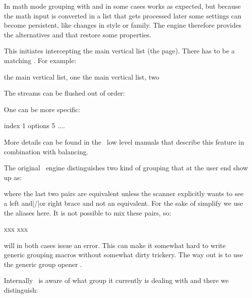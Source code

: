 In math mode grouping with  and  in some cases
works as expected, but because the math input is converted in a list that gets
processed later some settings can become persistent, like changes in style or
family. The engine therefore provides the alternatives  and
 that restore some properties.

\stopnewprimitive

\startnewprimitive[title={\prm {beginmvl}}]

This initiates intercepting the main vertical list (the page). There has to be a
matching . For example:

\starttyping
{} the main vertical list, one \endmvl
{} the main vertical list, two \endmvl
\stoptyping

The streams can be flushed out of order:

\starttyping
\setbox\scratchboxone{}
\setbox\scratchboxtwo{}
\stoptyping

One can be more specific:

\starttyping
\beginmvl
    index   1
    options 5 %
\relax
    ....
\endmvl
\stoptyping

More details can be found in the \CONTEXT\ low level manuals that describe this
feature in combination with balancing.

\stopnewprimitive

\startnewprimitive[title={\prm {beginsimplegroup}}]

The original \TEX\ engine distinguishes two kind of grouping that at the user end
show up as:

\starttyping
\begingroup \endgroup
\bgroup \egroup { }
\stoptyping

where the last two pairs are equivalent unless the scanner explicitly wants to see a
left and|/|or right brace and not an equivalent. For the sake of simplify we use
the aliases here. It is not possible to mix these pairs, so:

\starttyping
\bgroup xxx\endgroup
\begingroup xxx\egroup
\stoptyping

will in both cases issue an error. This can make it somewhat hard to write generic
grouping macros without somewhat dirty trickery. The way out is to use the generic
group opener .

Internally \LUAMETATEX\ is aware of  what group it currently is dealing with and
there we distinguish:

